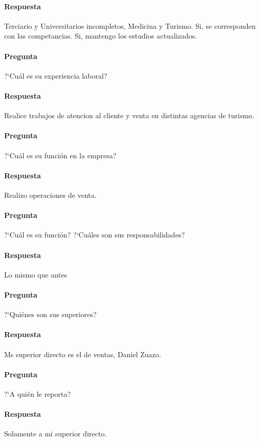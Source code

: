 \documentclass[12pt,a4paper,spanish]{article}
\begin{document}
	\paragraph{Respuesta}
Terciario y Universitarios incompletos, Medicina y Turismo.
Si, se corresponden con las competancias.
Si, mantengo los estudios actualizados.

	\paragraph{Pregunta}
	 ?`Cu\'al es su experiencia laboral?
	\paragraph{Respuesta}
Realice trabajos de atencion al cliente y venta en distintas agencias de turismo.

	\paragraph{Pregunta}
	 ?`Cu\'al es su funci\'on en la empresa?
	\paragraph{Respuesta}
	Realizo operaciones de venta.

	\paragraph{Pregunta}
	 ?`Cu\'al es su funci\'on?  ?`Cu\'ales son sus responsabilidades?
	\paragraph{Respuesta}
	Lo mismo que antes

	\paragraph{Pregunta}
	 ?`Qui\'enes son sus superiores? 
	\paragraph{Respuesta}
Ms superior directo es el de ventas, Daniel Zuazo.

	\paragraph{Pregunta}
	 ?`A qui\'en le reporta?
	\paragraph{Respuesta}
Solamente a mi superior directo.
\end{document}
